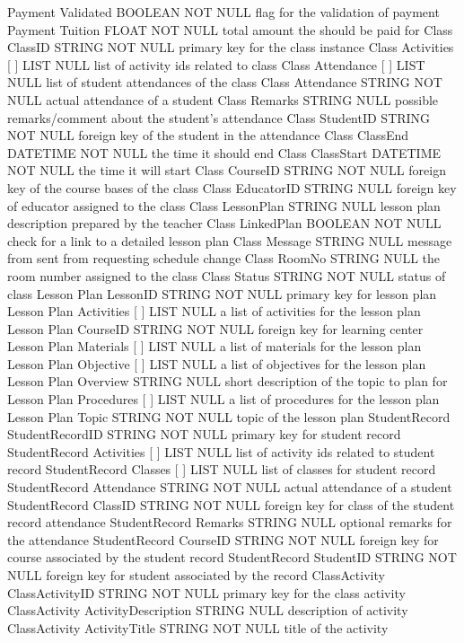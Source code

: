 Payment		Validated	BOOLEAN	NOT NULL	flag for the validation of payment
Payment	Tuition	 	FLOAT	NOT NULL	total amount the should be paid for
Class	ClassID	STRING	NOT NULL	primary key for the class instance
Class	Activities [ ]	LIST	NULL	list of activity ids related to class
Class	Attendance [ ] { }	LIST	NULL	list of student attendances of the class
Class	 	Attendance	STRING	NOT NULL	actual attendance of a student
Class		Remarks	STRING	NULL	possible remarks/comment about the student's attendance
Class		StudentID	STRING	NOT NULL	foreign key of the student in the attendance
Class	ClassEnd	DATETIME	NOT NULL	the time it should end
Class	ClassStart	DATETIME	NOT NULL	the time it will start
Class	CourseID	STRING	NOT NULL	foreign key of the course bases of the class
Class	EducatorID	STRING	NULL	foreign key of educator assigned to the class
Class 	LessonPlan	STRING	NULL	lesson plan description prepared by the teacher
Class 	LinkedPlan	BOOLEAN	NOT NULL	check for a link to a detailed lesson plan
Class	Message	STRING	NULL	message from sent from requesting schedule change
Class	RoomNo	STRING	NULL	the room number assigned to the class
Class	Status	STRING	NOT NULL	status of class
Lesson Plan	LessonID	STRING	NOT NULL	primary key for lesson plan
Lesson Plan	Activities [ ]	LIST	NULL	a list of activities for the lesson plan
Lesson Plan	CourseID	STRING	NOT NULL	foreign key for learning center
Lesson Plan	Materials [ ]	LIST	NULL	a list of materials for the lesson plan
Lesson Plan	Objective [ ]	LIST	NULL	a list of objectives for the lesson plan
Lesson Plan	Overview	STRING	NULL	short description of the topic to plan for
Lesson Plan	Procedures [ ]	LIST	NULL	a list of procedures for the lesson plan
Lesson Plan	Topic	STRING	NOT NULL	topic of the lesson plan
StudentRecord	StudentRecordID	STRING	NOT NULL	primary key for student record
StudentRecord	Activities [ ]	LIST	NULL	list of activity ids related to student record
StudentRecord	Classes [ ] { }	LIST	NULL	list of classes for student record
StudentRecord	 	Attendance	STRING	NOT NULL	actual attendance of a student
StudentRecord		ClassID	STRING	NOT NULL	foreign key for class of the student record attendance
StudentRecord		Remarks	STRING	NULL	optional remarks for the attendance
StudentRecord	CourseID	STRING	NOT NULL	foreign key for course associated by the student record
StudentRecord	StudentID	STRING	NOT NULL	foreign key for student associated by the record
ClassActivity	ClassActivityID	STRING	NOT NULL	primary key for the class activity
ClassActivity	ActivityDescription	STRING	NULL	description of activity
ClassActivity	ActivityTitle	STRING	NOT NULL	title of the activity
